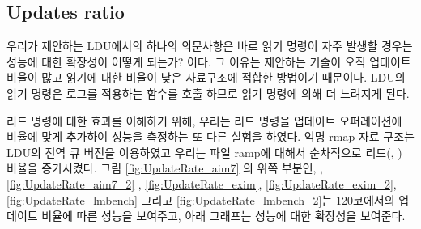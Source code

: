 \subsection{Updates ratio}

우리가 제안하는 LDU에서의 하나의 의문사항은 바로 읽기 명령이 자주 발생할 경우는 성능에 대한 확장성이 
어떻게 되는가? 이다.
그 이유는 제안하는 기술이 오직 업데이트 비율이 많고 읽기에 대한 비율이 낮은 자료구조에 적합한 방법이기 때문이다. 
LDU의 읽기 명령은 로그를 적용하는  함수를 호출 하므로 읽기 명령에 의해 
더 느려지게 된다. 

리드 명령에 대한 효과를 이해하기 위해, 우리는 리드 명령을 업데이트 오퍼레이션에 비율에 맞게 추가하여
성능을 측정하는 또 다른 실험을 하였다. 
익명 rmap 자료 구조는 LDU의 전역 큐 버전을 이용하였고 우리는 파일 ramp에 대해서
 순차적으로 리드(, ) 비율을 증가시켰다.
그림 \ref{fig:UpdateRate_aim7} 의 위쪽 부분인, 
,\ref{fig:UpdateRate_aim7_2} ,  \ref{fig:UpdateRate_exim}, 
\ref{fig:UpdateRate_exim_2},  \ref{fig:UpdateRate_lmbench} 그리고
\ref{fig:UpdateRate_lmbench_2}는 120코에서의 업데이트 비율에 따른 성능을 보여주고,
 아래 그래프는 성능에 대한 확장성을 보여준다.
 
